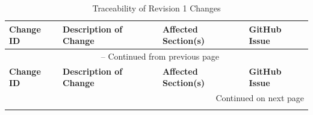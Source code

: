 \documentclass[12pt, titlepage]{article}
\begin{document}
\begin{longtable}{|p{}|p{}|p{}|p{}|}
\caption{Traceability of Revision 1 Changes} \label{tab:revision_traceability} \\
\hline
\textbf{Change ID} & \textbf{Description of Change} & \textbf{Affected Section(s)} & \textbf{GitHub Issue} \\
\hline
\endfirsthead

\multicolumn{4}{c}{\tablename\ \thetable{} -- Continued from previous page} \\
\hline
\textbf{Change ID} & \textbf{Description of Change} & \textbf{Affected Section(s)} & \textbf{GitHub Issue} \\
\hline
\endhead

\hline \multicolumn{4}{r}{Continued on next page} \\
\endfoot

\hline
\endlastfoot


\end{longtable}
\end{document}
